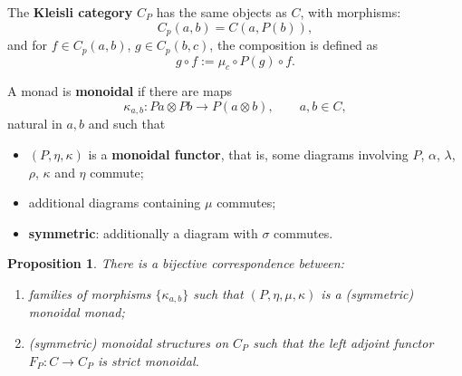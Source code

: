 \documentclass[12pt]{article}
\newtheorem{prop}{Proposition}
\theoremstyle{definition}
\theoremstyle{remark}
\begin{document}
The \textbf{Kleisli category} $C_P$ has the same objects as $C$, with morphisms:
\[
C_p(a,b)=C(a,P(b)),
\]
and for $f\in C_p(a,b)$, $g\in C_p(b,c)$, the composition is defined as
\[
g\circ f:=\mu_c\circ P(g)\circ f.
\]

 A monad is \textbf{monoidal} \cite{seal2013tensors} if there are maps
 \[
\kappa_{a,b}:Pa\otimes Pb\to P(a\otimes b),\qquad a,b\in C,
 \]
 natural in $a,b$ and such that 
 \begin{itemize}
\item $(P,\eta, \kappa)$ is a \textbf{monoidal functor}, that is, some diagrams involving
$P$, $\alpha$, $\lambda$, $\rho$, $\kappa$ and $\eta$ commute;
\item additional diagrams containing $\mu$ commutes;
\item\textbf{symmetric}: additionally a diagram with $\sigma$ commutes. 

 \end{itemize}

\begin{prop}\cite[Prop. 1.2.2]{seal2013tensors}  There is a bijective correspondence
between:
\begin{enumerate}
\item[(i)] families of morphisms $\{\kappa_{a,b}\}$ such that $(P,\eta,\mu,\kappa)$ is a
(symmetric)
monoidal monad;
\item[(ii)] (symmetric) monoidal structures on $C_P$ such that the left adjoint functor $F_P:C\to C_P$
is strict monoidal.

\end{enumerate}

\end{prop}
\end{document}
